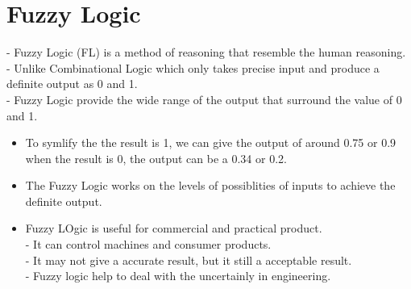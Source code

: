 \documentclass[12pt]{article}
\begin{document}
\section{Fuzzy Logic}
- Fuzzy Logic (FL) is a method of reasoning that resemble the human reasoning.\\
- Unlike Combinational Logic which only takes precise input and produce a definite output as 0 and 1. \\
- Fuzzy Logic provide the wide range of the output that surround the value of 0 and 1.\\
\begin{itemize}
	\item To symlify the the result is 1, we can give the output of around 0.75 or 0.9 when the result is 0, the output can be a 0.34 or 0.2.
	\item The Fuzzy Logic works on the levels of possiblities of inputs to achieve the definite output.
	\item Fuzzy LOgic is useful for commercial and practical product. \\
	- It can control machines and consumer products. \\
	- It may not give a accurate result, but it still a acceptable result. \\
	- Fuzzy logic help to deal with the uncertainly in engineering.
\end{itemize}
\end{document}
